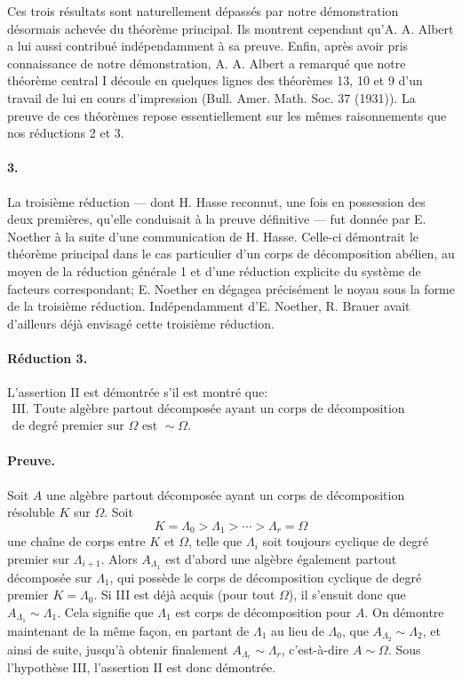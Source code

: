 {Ces trois résultats sont naturellement dépassés par notre démonstration désormais achevée du théorème principal. Ils montrent cependant qu'A. A. Albert a lui aussi contribué indépendamment à sa preuve. Enfin, après avoir pris connaissance de notre démonstration, A. A. Albert a remarqué que notre théorème central I découle en quelques lignes des théorèmes 13, 10 et 9 d'un travail de lui en cours d'impression (Bull. Amer. Math. Soc. 37 (1931)). La preuve de ces théorèmes repose essentiellement sur les mêmes raisonnements que nos réductions 2 et 3.}

\paragraph{3.}
La troisième réduction --- dont H. Hasse reconnut, une fois en possession des deux premières, qu'elle conduisait à la preuve définitive --- fut donnée par E. Noether à la suite d'une communication de H. Hasse. Celle-ci démontrait le théorème principal dans le cas particulier d'un corps de décomposition abélien, au moyen de la réduction générale 1 et d'une réduction explicite du système de facteurs correspondant; E. Noether en dégagea précisément le noyau sous la forme de la troisième réduction. Indépendamment d'E. Noether, R. Brauer avait d'ailleurs déjà envisagé cette troisième réduction.

\paragraph{Réduction 3.}
L'assertion II est démontrée s'il est montré que:
\[
\begin{gathered}\text{III. Toute algèbre partout décomposée ayant un corps de décomposition cyclique}\\\text{de degré premier sur }\Omega\text{ est }\sim\Omega .\end{gathered}
\]

\paragraph{Preuve.}
Soit \(A\) une algèbre partout décomposée ayant un corps de décomposition résoluble \(K\) sur \(\Omega\). Soit
\[
K=\Lambda_0>\Lambda_1>\cdots>\Lambda_r=\Omega
\]
une chaîne de corps entre \(K\) et \(\Omega\), telle que \(\Lambda_i\) soit toujours cyclique de degré premier sur \(\Lambda_{i+1}\). Alors \(A_{\Lambda_1}\) est d'abord une algèbre également partout décomposée sur \(\Lambda_1\), qui possède le corps de décomposition cyclique de degré premier \(K=\Lambda_0\). Si III est déjà acquis (pour tout \(\Omega\)), il s'ensuit donc que \(A_{\Lambda_1}\sim \Lambda_1\). Cela signifie que \(\Lambda_1\) est corps de décomposition pour \(A\). On démontre maintenant de la même façon, en partant de \(\Lambda_1\) au lieu de \(\Lambda_0\), que \(A_{\Lambda_2}\sim\Lambda_2\), et ainsi de suite, jusqu'à obtenir finalement \(A_{\Lambda_r}\sim\Lambda_r\), c'est-à-dire \(A\sim\Omega\). Sous l'hypothèse III, l'assertion II est donc démontrée.

